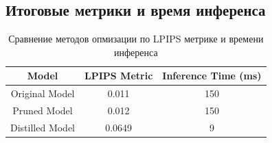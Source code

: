 \documentclass[14pt]{article}
\begin{document}
\subsection{Итоговые метрики и время инференса}


\begin{table}[H]
    \centering
    \begin{tabular}{|c|c|c|}
        \hline
        \textbf{Model} & \textbf{LPIPS Metric} & \textbf{Inference Time (ms)} \\ \hline
        Original Model & 0.011 & 150 \\ \hline
        Pruned Model & 0.012 & 150 \\ \hline
        Distilled Model & 0.0649 & 9 \\ \hline
    \end{tabular}
    \caption{Сравнение методов опмизации по LPIPS метрике и времени инференса}
    \label{tab:lpips_inference_comparison}
\end{table}


\pagebreak
\printbibliography
\end{document}
